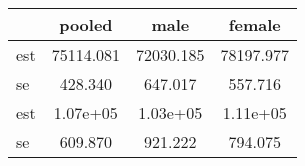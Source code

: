 \begin{table}[htbp]
\begin{tabular}{lccc} \hline \hline
 & pooled  & male  & female  \\  \hline 
est & 75114.081 & 72030.185 & 78197.977 \\  
se &   428.340 &   647.017 &   557.716 \\  
est &  1.07e+05 &  1.03e+05 &  1.11e+05 \\  
se &   609.870 &   921.222 &   794.075 \\  
\hline \hline \end{tabular}
\end{table}
